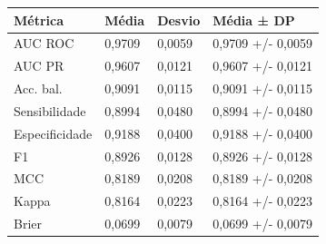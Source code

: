 \begin{tabular}{llll}
\toprule
Métrica & Média & Desvio & Média ± DP \\
\midrule
AUC ROC & 0,9709 & 0,0059 & 0,9709 +/- 0,0059 \\
AUC PR & 0,9607 & 0,0121 & 0,9607 +/- 0,0121 \\
Acc. bal. & 0,9091 & 0,0115 & 0,9091 +/- 0,0115 \\
Sensibilidade & 0,8994 & 0,0480 & 0,8994 +/- 0,0480 \\
Especificidade & 0,9188 & 0,0400 & 0,9188 +/- 0,0400 \\
F1 & 0,8926 & 0,0128 & 0,8926 +/- 0,0128 \\
MCC & 0,8189 & 0,0208 & 0,8189 +/- 0,0208 \\
Kappa & 0,8164 & 0,0223 & 0,8164 +/- 0,0223 \\
Brier & 0,0699 & 0,0079 & 0,0699 +/- 0,0079 \\
\bottomrule
\end{tabular}
